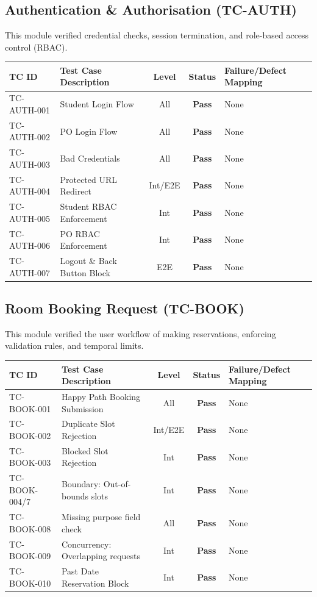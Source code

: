 \documentclass[11pt,a4paper]{article}
\begin{document}
\subsection{Authentication \& Authorisation (TC-AUTH)}
This module verified credential checks, session termination, and role-based access control (RBAC).
\begin{center}
\begin{longtable}{llccp{5.5cm}}
\toprule
\textbf{TC ID} & \textbf{Test Case Description} & \textbf{Level} & \textbf{Status} & \textbf{Failure/Defect Mapping} \\ \midrule
TC-AUTH-001 & Student Login Flow & All & \color{passgreenfg}\textbf{Pass} & None \\
TC-AUTH-002 & PO Login Flow & All & \color{passgreenfg}\textbf{Pass} & None \\
TC-AUTH-003 & Bad Credentials & All & \color{passgreenfg}\textbf{Pass} & None \\
TC-AUTH-004 & Protected URL Redirect & Int/E2E & \color{passgreenfg}\textbf{Pass} & None \\
TC-AUTH-005 & Student RBAC Enforcement & Int & \color{passgreenfg}\textbf{Pass} & None \\
TC-AUTH-006 & PO RBAC Enforcement & Int & \color{passgreenfg}\textbf{Pass} & None \\
TC-AUTH-007 & Logout \& Back Button Block & E2E & \color{passgreenfg}\textbf{Pass} & None \\
\bottomrule
\end{longtable}
\end{center}

\subsection{Room Booking Request (TC-BOOK)}
This module verified the user workflow of making reservations, enforcing validation rules, and temporal limits.
\begin{center}
\begin{longtable}{llccp{4cm}}
\toprule
\textbf{TC ID} & \textbf{Test Case Description} & \textbf{Level} & \textbf{Status} & \textbf{Failure/Defect Mapping} \\ \midrule
TC-BOOK-001 & Happy Path Booking Submission & All & \color{passgreenfg}\textbf{Pass} & None \\
TC-BOOK-002 & Duplicate Slot Rejection & Int/E2E & \color{passgreenfg}\textbf{Pass} & None \\
TC-BOOK-003 & Blocked Slot Rejection & Int & \color{passgreenfg}\textbf{Pass} & None \\
TC-BOOK-004/7 & Boundary: Out-of-bounds slots & Int & \color{passgreenfg}\textbf{Pass} & None \\
TC-BOOK-008 & Missing purpose field check & All & \color{passgreenfg}\textbf{Pass} & None \\
TC-BOOK-009 & Concurrency: Overlapping requests & Int & \color{passgreenfg}\textbf{Pass} & None \\
TC-BOOK-010 & Past Date Reservation Block & Int & \color{passgreenfg}\textbf{Pass} & None \\
\bottomrule
\end{longtable}
\end{center}
\end{document}

